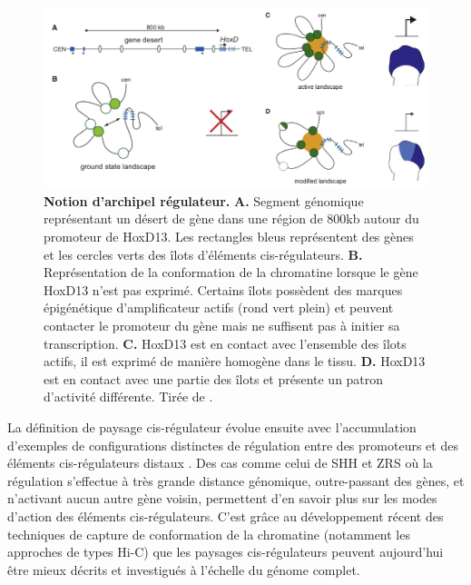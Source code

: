 \begin{figure}[h]
    \centering
    \includegraphics[width=1\textwidth, page=1] {figures/introduction/fig21.png}
    \caption[Notion d'archipel régulateur.]{
    \textbf{Notion d'archipel régulateur.}
    \textbf{A.} Segment génomique représentant un désert de gène dans une région de 800kb autour du promoteur de HoxD13. Les rectangles bleus représentent des gènes et les cercles verts des îlots d'éléments \gls{cis}-régulateurs. \textbf{B.} Représentation de la conformation de la chromatine lorsque le gène HoxD13 n'est pas exprimé. Certains îlots possèdent des marques épigénétique d'\gls{amplificateur} actifs (rond vert plein) et peuvent contacter le promoteur du gène mais ne suffisent pas à initier sa transcription. \textbf{C.} HoxD13 est en contact avec l'ensemble des îlots actifs, il est exprimé de manière homogène dans le tissu. \textbf{D.} HoxD13 est en contact avec une partie des îlots et présente un patron d'activité différente. Tirée de \citep{montavon_regulatory_2011}. \\
    }
    \label{fig:Fig21}
\end{figure}

La définition de paysage \gls{cis}-régulateur évolue ensuite avec l’accumulation d’exemples de configurations distinctes de régulation entre des promoteurs et des éléments \gls{cis}-régulateurs distaux \citep{montavon_landscapes_2012}. Des cas comme celui de \acrshort{SHH} et \acrshort{ZRS} où la régulation s’effectue à très grande distance génomique, outre-passant des gènes, et n'activant aucun autre gène voisin, permettent d’en savoir plus sur les modes d’action des éléments \gls{cis}-régulateurs. C’est grâce au développement récent des techniques de capture de conformation de la chromatine (notamment les approches de types \acrshort{Hi-C}) que les paysages \gls{cis}-régulateurs peuvent aujourd’hui être mieux décrits et investigués à l’échelle du génome complet. \\

